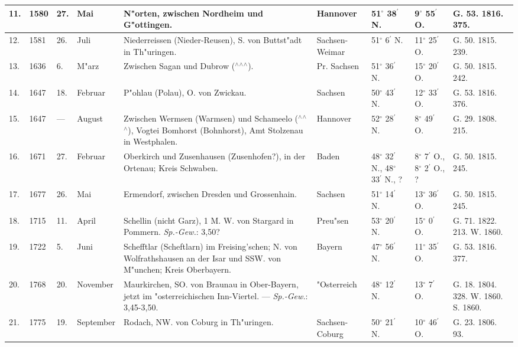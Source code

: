 \documentclass[a4paper, 8pt, oneside, polutonikogreek, german]{article}
\begin{document}
\begin{center}
\begin{longtable}{|p{3mm}|p{13mm}|p{5mm}|p{16mm}|p{25mm}|p{13mm}|p{13mm}|p{13mm}|p{13mm}|}
        11. & 1580 & 27. & Mai & N"orten, zwischen Nordheim und G"ottingen. & Hannover & 51$^\circ$ 38$^\prime$ N. & 9$^\circ$ 55$^\prime$ O. & G. 53. 1816. 375. \\ \hline
        12. & 1581 & 26. & Juli & Niederreissen (Nieder-Reusen), S. von Buttst"adt in Th"uringen. & Sachsen-Weimar & 51$^\circ$ 6$^\prime$ N. & 11$^\circ$ 25$^\prime$ O. & G. 50. 1815. 239. \\ \hline
        13. & 1636 & 6. & M"arz & Zwischen Sagan und Dubrow ($^\wedge$$^\wedge$$^\wedge$). & Pr. Sachsen & 51$^\circ$ 36$^\prime$ N. & 15$^\circ$ 20$^\prime$ O. & G. 50. 1815. 242. \\ \hline
        14. & 1647 & 18. & Februar & P"ohlau (Polau), O. von Zwickau. & Sachsen & 50$^\circ$ 43$^\prime$ N. & 12$^\circ$ 33$^\prime$ O. & G. 53. 1816. 376. \\ \hline
        15. & 1647 & --- & August & Zwischen Wermsen (Warmsen) und Schameelo ($^\wedge$$^\wedge$$^\wedge$), Vogtei Bomhorst (Bohnhorst), Amt Stolzenau in Westphalen. & Hannover & 52$^\circ$ 28$^\prime$ N. & 8$^\circ$ 49$^\prime$ O. & G. 29. 1808. 215. \\ \hline
        16. & 1671 & 27. & Februar & Oberkirch und Zusenhausen (Zusenhofen?), in der Ortenau; Kreis Schwaben. & Baden & 48$^\circ$ 32$^\prime$ N., 48$^\circ$ 33$^\prime$ N., ? & 8$^\circ$ 7$^\prime$ O., 8$^\circ$ 2$^\prime$ O., ? & G. 50. 1815. 245. \\ \hline
        17. & 1677 & 26. & Mai & Ermendorf, zwischen Dresden und Grossenhain. & Sachsen & 51$^\circ$ 14$^\prime$ N. & 13$^\circ$ 36$^\prime$ O. & G. 50. 1815. 245. \\ \hline
        18. & 1715 & 11. & April & Schellin (nicht Garz), 1 M. W. von Stargard in Pommern. \emph{Sp.-Gew.}: 3,50? & Preu"sen & 53$^\circ$ 20$^\prime$ N. & 15$^\circ$ 0$^\prime$ O. & G. 71. 1822. 213. W. 1860. \\ \hline
        19. & 1722 & 5. & Juni & Schefftlar (Scheftlarn) im Freising’schen; N. von Wolfrathshausen an der Isar und SSW. von M"unchen; Kreis Oberbayern. & Bayern & 47$^\circ$ 56$^\prime$ N. & 11$^\circ$ 35$^\prime$ O. & G. 53. 1816. 377. \\ \hline
        20. & 1768 & 20. & November & Maurkirchen, SO. von Braunau in Ober-Bayern, jetzt im "osterreichischen Inn-Viertel. --- \emph{Sp.-Gew.}: 3,45-3,50. & "Osterreich & 48$^\circ$ 12$^\prime$ N. & 13$^\circ$ 7$^\prime$ O. & G. 18. 1804. 328. W. 1860. S. 1860. \\ \hline
        21. & 1775 & 19. & September & Rodach, NW. von Coburg in Th"uringen. & Sachsen-Coburg & 50$^\circ$ 21$^\prime$ N. & 10$^\circ$ 46$^\prime$ O. & G. 23. 1806. 93. \\ \hline

\end{longtable}
\end{center}
\end{document}
